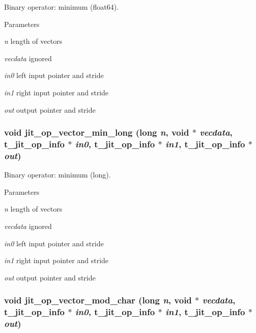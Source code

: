 Binary operator: minimum (float64). 
\begin{DoxyParams}{Parameters}
\item[{\em n}]length of vectors \item[{\em vecdata}]ignored \item[{\em in0}]left input pointer and stride \item[{\em in1}]right input pointer and stride \item[{\em out}]output pointer and stride \end{DoxyParams}
\hypertarget{group__opvecmod_gac673d3a9b0d7691e89ebe13bd09d0863}{
\subsubsection[{jit\_\-op\_\-vector\_\-min\_\-long}]{\setlength{\rightskip}{0pt plus 5cm}void jit\_\-op\_\-vector\_\-min\_\-long (long {\em n}, \/  void $\ast$ {\em vecdata}, \/  {\bf t\_\-jit\_\-op\_\-info} $\ast$ {\em in0}, \/  {\bf t\_\-jit\_\-op\_\-info} $\ast$ {\em in1}, \/  {\bf t\_\-jit\_\-op\_\-info} $\ast$ {\em out})}}
\label{group__opvecmod_gac673d3a9b0d7691e89ebe13bd09d0863}


Binary operator: minimum (long). 
\begin{DoxyParams}{Parameters}
\item[{\em n}]length of vectors \item[{\em vecdata}]ignored \item[{\em in0}]left input pointer and stride \item[{\em in1}]right input pointer and stride \item[{\em out}]output pointer and stride \end{DoxyParams}
\hypertarget{group__opvecmod_gad07318c7b4b42c9ea83e4d08abac3f57}{
\subsubsection[{jit\_\-op\_\-vector\_\-mod\_\-char}]{\setlength{\rightskip}{0pt plus 5cm}void jit\_\-op\_\-vector\_\-mod\_\-char (long {\em n}, \/  void $\ast$ {\em vecdata}, \/  {\bf t\_\-jit\_\-op\_\-info} $\ast$ {\em in0}, \/  {\bf t\_\-jit\_\-op\_\-info} $\ast$ {\em in1}, \/  {\bf t\_\-jit\_\-op\_\-info} $\ast$ {\em out})}}
\label{group__opvecmod_gad07318c7b4b42c9ea83e4d08abac3f57}


